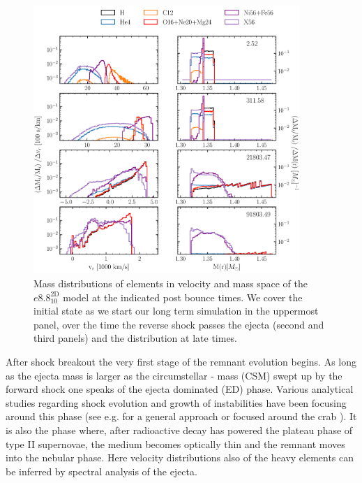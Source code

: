 \documentclass[fleqn,usenatbib]{mnras}
\begin{document}
\begin{figure}
 \centering
 \includegraphics[width=0.9\textwidth]{pic/e8_10_mvr_mas_4times.pdf}
 \caption{Mass distributions of elements in velocity and mass space  of the $e8.8^{\mathrm{2D}}_{10}$ model at the indicated post bounce times. We cover the initial state as we start our long term simulation in the uppermost panel, over the time the reverse shock passes the ejecta (second and third panels) and the distribution at late times.}
 \label{fig:e8_massDis_4times}
\end{figure}

After shock breakout the very first stage of the remnant evolution begins. As long as the ejecta mass is larger as the circumstellar - mass (CSM) swept up by the forward shock one speaks of the ejecta dominated (ED) phase. Various analytical studies regarding shock evolution and growth of instabilities have been focusing around this phase (see e.g. \cite{Truelove1999EvolutionRemnants} for a general approach or focused around the crab \cite{Chevalier1984TheSurroundings}).  It is also the phase where, after radioactive decay has powered the plateau phase of type II supernovae, the medium becomes optically thin and the remnant moves into the nebular phase. Here velocity distributions also of the heavy elements can be inferred by spectral analysis of the ejecta.
\end{document}
